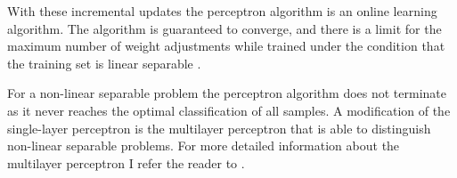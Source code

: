 With these incremental updates the perceptron algorithm is an online learning algorithm.
The algorithm is guaranteed to converge, and there is a limit for the maximum number of weight adjustments while trained under the condition that the training set is linear separable \cite{Wikipedia2016Perceptron}. %

For a non-linear separable problem the perceptron algorithm does not terminate as it never reaches the optimal classification of all samples. %
A modification of the single-layer perceptron is the multilayer perceptron that is able to distinguish non-linear separable problems.
For more detailed information about the multilayer perceptron I refer the reader to \cite{Wikipedia2017MultilayerPerceptron}.











